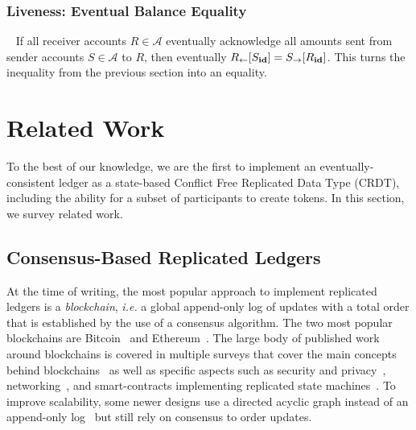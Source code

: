 \documentclass[9pt, oneside]{article}   	%
\begin{document}
\subsubsection{Liveness: Eventual Balance Equality}
\label{sec:proof:balance-liveness}

\pf~ If all receiver accounts $R \in \mathcal{A}$ eventually acknowledge all amounts sent from sender accounts $S \in \mathcal{A}$ to $R$, then eventually $R_{\leftarrow}[S_{\scriptsize \textbf{id}}] = S_{\rightarrow}[R_{\scriptsize \textbf{id}}]$. This turns the inequality from the previous section into an equality.


\section{Related Work}
\label{sec:related-work}

To the best of our knowledge, we are the first to implement an eventually-consistent ledger as a state-based Conflict Free Replicated Data Type (CRDT), including the ability for a subset of participants to create tokens. In this section, we survey related work.

\subsection{Consensus-Based Replicated Ledgers}

At the time of writing, the most popular approach to implement replicated ledgers is a \textit{blockchain}, \textit{i.e.} a global append-only log of updates with a total order that is established by the use of a consensus algorithm. The two most popular blockchains are Bitcoin~\cite{nakamoto2008bitcoin} and Ethereum~\cite{buterin2014next}. The large body of published work around blockchains is covered in multiple surveys that cover the main concepts behind blockchains~\cite{weichao2018blockchain,kolb2020survey-blockchains-ethereum} as well as specific aspects such as security and privacy~\cite{zhang2020survey-security-privacy-blockchains}, networking~\cite{dotan2022survey-blockchain-networking}, and smart-contracts implementing replicated state machines~\cite{kolb2020survey-blockchains-ethereum}. To improve scalability, some newer designs use a directed acyclic graph instead of an append-only log~\cite{kolb2020survey-blockchains-ethereum} but still rely on consensus to order updates.
\end{document}

